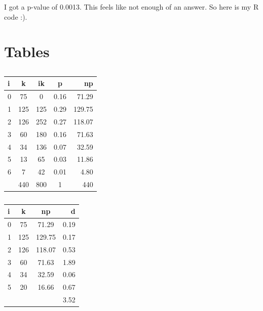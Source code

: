 \documentclass[12pt]{article}
\newenvironment{problem}[2][Problem]{\begin{trivlist}
\item[\hskip \labelsep {\bfseries #1}\hskip \labelsep {\bfseries #2.}]}{\end{trivlist}}
\begin{document}
\begin{problem}{Randomization Test} I got a p-value of 0.0013. This feels like not enough of an answer. So here is my R code :). 
%
%  
%
%  
%  
%
%

\end{problem}
\newpage
\section{Tables}
\begin{table}[h!]
\centering
\begin{tabular}{ l | c | c | c | r }		
i  &	k	&		ik 	&	p 	 &		np    \\
\hline
0 &	75	&		0	&	0.16 &	71.29  \\  
1 &	125	&		125	&	0.29 &	129.75   \\
2 &	126	&		252	&	0.27 &	118.07  \\
3 &	60	&		180	&	0.16 &	71.63     \\
4 & 	34	&		136	&	0.07 &	32.59  \\
5 &	13	&		65	&	0.03 &	11.86  \\
6 &	7	&		42	&	0.01 &	4.80  \\
\hline
  &	440 &		800	&	1	 &	440      \\
\end{tabular}
\caption{}
\end{table}

\begin{table}[h!]
\centering
\begin{tabular}{ l | c | c | r }		
i&		k	&np	& d \\
\hline
0&		75	&71.29	&0.19 \\
1&		125	&129.75	&0.17 \\
2&		126	&118.07	&0.53 \\
3&		60	&71.63	&1.89 \\
4&		34	&32.59	&0.06 \\ 
5&	20	&16.66	&0.67 \\
\hline
	&		& 		&3.52 \\
\end{tabular}
\caption{}
\end{table}
\end{document}
